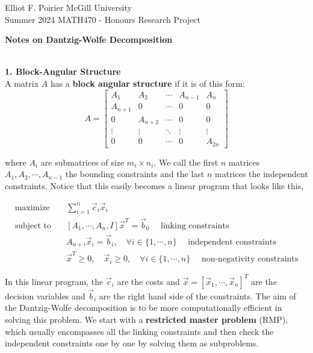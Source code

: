\documentclass[11pt]{article}
\begin{document}
\noindent Elliot F. Poirier
\hfill
McGill University
\\
Summer 2024
\hfill
MATH470 - Honours Research Project
\\
\begin{center}
\textbf{\Large{Notes on Dantzig-Wolfe Decomposition}}
\end{center}
\hfill
\\
\noindent \textbf{\large{1. Block-Angular Structure}}
\\

\noindent A matrix $A$ has a \textbf{block angular structure} if it is of this form:
\[
A = \begin{bmatrix}
A_{1} & A_{2} & \cdots & A_{n-1} & A_{n} \\
A_{n+1} & 0 & \cdots & 0 & 0 \\
0 & A_{n+2} & \cdots & 0 & 0 \\
\vdots & \vdots & \ddots & \vdots & \vdots \\
0 & 0 & \cdots & 0 & A_{2n}
\end{bmatrix}
\]

\noindent where $A_{i}$ are submatrices of size $m_i \times n_i$. We call the first $n$ matrices $A_1, A_2, \cdots, A_{n-1}$ the bounding constraints and the last $n$ matrices the independent constraints. Notice that this easily becomes a linear program that looks like this, 

$$
\begin{aligned}
\text{maximize} \quad & \sum_{i=1}^{n} \vec{c}_i \vec{x}_i \\
\text{subject to} \quad & [A_1, \cdots, A_n, I] \vec{x}^T = \vec{b}_0 \quad \text{  linking constraints}\\
& A_{n+i} \vec{x}_i = \vec{b}_i, \quad \forall i \in \{1, \cdots, n\} \quad \text{  independent constraints} \\
& \vec{x}^T \geq 0, \quad \vec{x}_i \geq 0, \quad \forall i \in \{1, \cdots, n\} \quad \text{  non-negativity constraints}
\end{aligned}
$$

\noindent In this linear program, the $\vec{c}_i$ are the costs and $\vec{x} = [\vec{x}_1, \cdots, \vec{x}_n]^T$ are the decision variables and $\vec{b}_i$ are the right hand side of the constraints. The aim of the Dantzig-Wolfe decomposition is to be more computationally efficient in solving this problem. We start with a \textbf{restricted master problem} (RMP), which usually encompasses all the linking constraints and then check the independent constraints one by one by solving them as subproblems.
\end{document}
